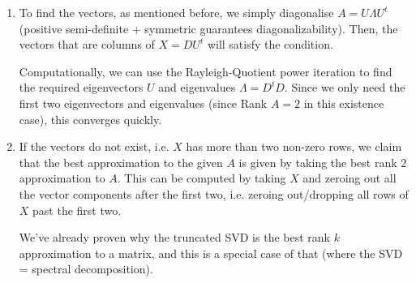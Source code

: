 \documentclass[12pt]{article}
\newenvironment*{qparts}{\begin{enumerate}[label=(\alph*)]}{\end{enumerate}}
\begin{document}
\begin{qparts}
	Then, there exist a planar set of such vectors if and only if $\text{Rank } X = \text{Rank } A \leq 2$.

	\item To find the vectors, as mentioned before, we simply diagonalise $A = U\Lambda U^t$ (positive semi-definite + symmetric guarantees diagonalizability). Then, the vectors that are columns of $X = DU^t$ will satisfy the condition.\medskip
	
	Computationally, we can use the Rayleigh-Quotient power iteration to find the required eigenvectors $U$ and eigenvalues $\Lambda = D^tD$. Since we only need the first two eigenvectors and eigenvalues (since Rank $A = 2$ in this existence case), this converges quickly.

	\item If the vectors do not exist, i.e. $X$ has more than two non-zero rows, we claim that the best approximation to the given $A$ is given by taking the best rank $2$ approximation to $A$. This can be computed by taking $X$ and zeroing out all the vector components after the first two, i.e. zeroing out/dropping all rows of $X$ past the first two.\medskip
	
	We've already proven why the truncated SVD is the best rank $k$ approximation to a matrix, and this is a special case of that (where the SVD = spectral decomposition).\medskip
\end{qparts}
\end{document}
